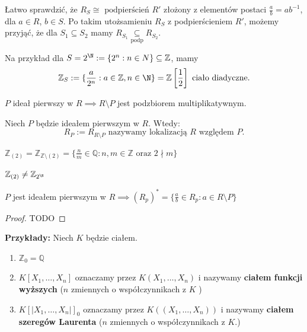 Łatwo sprawdzić, że $R_{S}\cong \text{ podpierścień }R'$ złożony z elementów postaci $\frac{a}{b} = ab^{-1}$, dla $a\in R$, $b\in S$. Po takim utożsamieniu $R_{S}$ z podpierścieniem $R'$, możemy przyjąć, że dla $S_1\subseteq S_2$ mamy $R_{\scriptscriptstyle S_1}\underset{\scriptscriptstyle\text{podp}}{\subseteq} R_{\scriptscriptstyle S_2}$.

Na przykład dla $S = 2^{\N} := \{2^{n}: n\in N\} \subseteq \mathbb{Z} $,
mamy 
\[
\mathbb{Z} _{S} := \{\frac{a}{2^{n}}: a \in \mathbb{Z} , n \in \N\} = \mathbb{Z} \left[ \frac{1}{2} \right] \text{ ciało diadyczne}
.\] 

\begin{fact}

	$P$ ideał pierwszy w $R \implies R\setminus P$ jest podzbiorem multiplikatywnym.
\end{fact}
\begin{definition}
	Niech $P$ będzie ideałem pierwszym w $R$. Wtedy: \[
	R_{P} := R_{\scriptscriptstyle R\setminus P}\text{ nazywamy lokalizacją $R$ względem  $P$}
	.\] 
\end{definition} 
\begin{eg}
 $\mathbb{Z} _{(2)} = \mathbb{Z} _{\mathbb{Z} \setminus (2)} = \{\frac{n}{m}\in \mathbb{Q} : n,m\in \mathbb{Z} \text{ oraz }2 \nmid m  \} $
\end{eg} 
\begin{remark}
	
	$\mathbb{Z}_{(2)}\neq \mathbb{Z} _{2^{\N}}$
\end{remark} 
\begin{theorem}
	$P$ jest ideałem pierwszym w $R \implies \left( R_{p} \right)^{\ast} = \{\frac{a}{b}\in R_{p}: a \in R\setminus P\} $
\end{theorem} 
\begin{proof}
	TODO
\end{proof} 
\textbf{Przykłady:}
Niech $K$ będzie ciałem.
\begin{enumerate}[label=\arabic*)]
	\item $\mathbb{Z}_{0} = \mathbb{Q}$
	\item $K\left[ X_1,\ldots,X_{n}  \right] $ oznaczamy przez $K\left( X_1,\ldots,X_{n}  \right) $ 
		i nazywamy \textbf{ciałem funkcji wyższych} ($n$ zmiennych o współczynnikach z $K$ )
	\item $K\left[ \left| X_1,\ldots,X_{n}  \right|  \right] _{0}$ oznaczamy przez $K\left( \left( X_1,\ldots,X_{n}  \right)  \right) $ i nazywamy \textbf{ciałem szeregów Laurenta} ($n$ zmiennych o współczynnikach z $K$.)
\end{enumerate}

